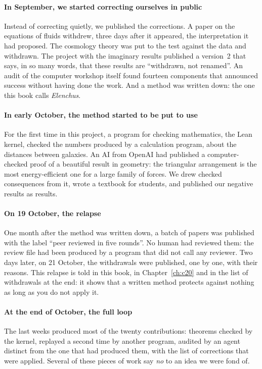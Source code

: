 \paragraph{In September, we started correcting ourselves in public} Instead of correcting quietly, we published the
corrections. A paper on the equations of fluids withdrew, three days after it appeared, the interpretation it had
proposed. The cosmology theory was put to the test against the data and withdrawn. The project with the imaginary
results published a version~2 that says, in so many words, that these results are ``withdrawn, not renamed''. An
audit of the computer workshop itself found fourteen components that announced success without having done the work.
And a method was written down: the one this book calls \emph{Elenchus}.

\paragraph{In early October, the method started to be put to use} For the first time in this project, a program for checking
mathematics, the Lean kernel, checked the numbers produced by a calculation program, about the distances between
galaxies. An AI from OpenAI had published a computer-checked proof of a beautiful result in geometry: the triangular
arrangement is the most energy-efficient one for a large family of forces. We drew checked consequences from it,
wrote a textbook for students, and published our negative results as results.

\paragraph{On 19 October, the relapse} One month after the method was written down, a batch of papers was published
with the label ``peer reviewed in five rounds''. No human had reviewed them: the review file had been produced by a
program that did not call any reviewer. Two days later, on 21 October, the withdrawals were published, one by one,
with their reasons. This relapse is told in this book, in Chapter~\ref{ch:c20} and in the list of withdrawals at the
end: it shows that a written method protects against nothing as long as you do not apply it.

\paragraph{At the end of October, the full loop} The last weeks produced most of the twenty contributions: theorems
checked by the kernel, replayed a second time by another program, audited by an agent distinct from the one that had
produced them, with the list of corrections that were applied. Several of these pieces of work say \emph{no} to an
idea we were fond of.

